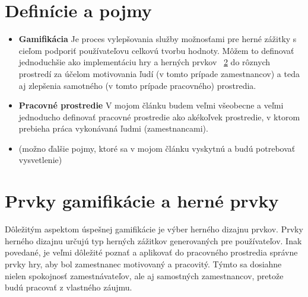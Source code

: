 \documentclass{article}
\begin{document}
\section{Definície a pojmy} \label{definície}
\begin{itemize}
\item \textbf{Gamifikácia} Je proces vylepšovania služby
možnosťami pre herné zážitky s cieľom podporiť používateľovu
celkovú tvorbu hodnoty\cite{10.1145/2393132.2393137}. Môžem to definovať jednoduchšie ako implementáciu hry a herných prvkov ~\ref{prvky} do rôznych prostredí za účelom motivovania ľudí (v tomto prípade zamestnancov) a teda aj zlepšenia samotného (v tomto prípade pracovného) prostredia.
\item \textbf{Pracovné prostredie} V mojom článku budem veľmi všeobecne a veľmi jednoducho definovať pracovné prostredie ako akékoľvek prostredie, v ktorom prebieha práca vykonávaná ľudmi (zamestnancami).
\item (možno ďalšie pojmy, ktoré sa v mojom článku vyskytnú a budú potrebovať vysvetlenie)
\end{itemize}
%


\begin{figure*}[tbh]
\centering
\end{figure*}

\section{Prvky gamifikácie a herné prvky} \label{prvky}


Dôležitým aspektom úspešnej gamifikácie je výber herného dizajnu
prvkov. Prvky herného dizajnu určujú typ herných zážitkov
generovaných pre používateľov\cite{herne}. Inak povedané, je veľmi dôležité poznať a aplikovať do pracovného prostredia správne prvky hry, aby bol zamestnanec motivovaný a pracovitý. Týmto sa dosiahne nielen spokojnosť zamestnávateľov, ale aj samostných zamestnancov, pretože budú pracovať z vlastného záujmu. 
\end{document}
